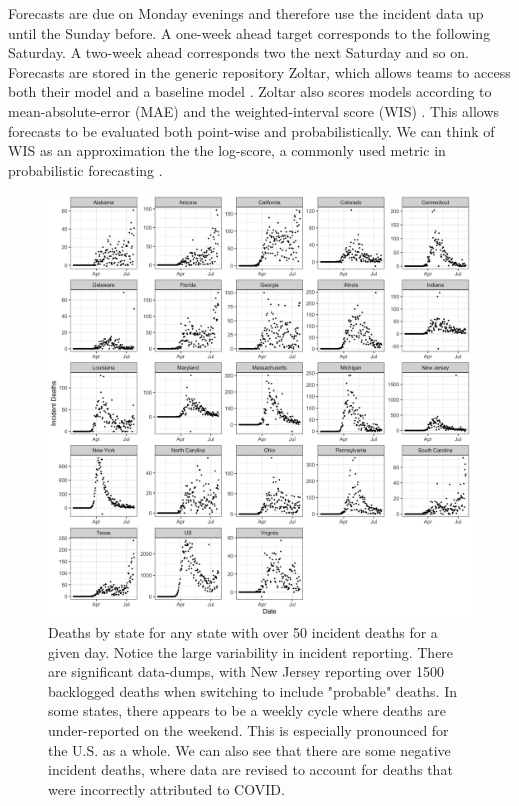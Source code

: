 \documentclass[11pt]{amsart}
\begin{document}
Forecasts are due on Monday evenings and therefore use the incident data up until the Sunday before. A one-week ahead target corresponds to the following Saturday. A two-week ahead corresponds two the next Saturday and so on. Forecasts are stored in the generic repository Zoltar, which allows teams to access both their model and a baseline model \cite{reich2020zoltar}. Zoltar also scores models according to mean-absolute-error (MAE) and the weighted-interval score (WIS) \cite{bracher2020evaluating}. This allows forecasts to be evaluated both point-wise and probabilistically. We can think of WIS as an approximation the the log-score, a commonly used metric in probabilistic forecasting \cite{bracher2019multibin}\cite{reich2019reply}.



 \begin{figure}
     \centering
     \includegraphics[scale=.14]{data_plot.png}
     \caption{Deaths by state for any state with over 50 incident deaths for a given day. Notice the large variability in incident reporting. There are significant data-dumps, with New Jersey reporting over 1500 backlogged deaths when switching to include "probable" deaths. In some states, there appears to be a weekly cycle where deaths are under-reported on the weekend. This is especially pronounced for the U.S. as a whole. We can also see that there are some negative incident deaths, where data are revised to account for deaths that were incorrectly attributed to COVID. }
     \label{fig:data}
 \end{figure}
 
\end{document}
